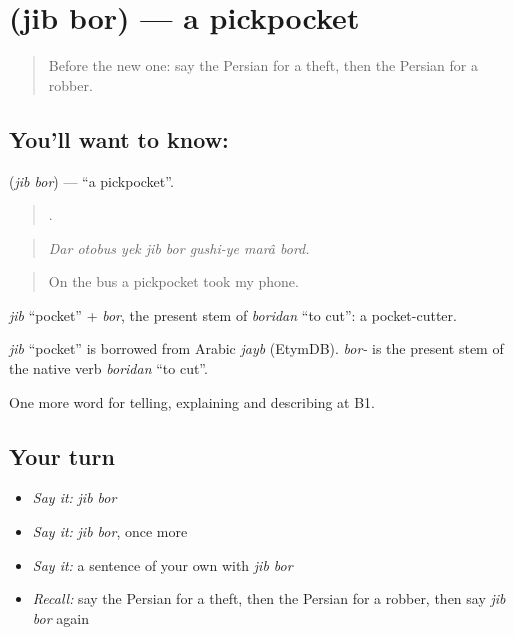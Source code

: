 \section[\texorpdfstring{\fa{جیب} \fa{بر} (jib bor)}{جیب بر (jib bor)}]{  (jib bor) — a pickpocket}

\label{lesson:FA-C316-jib-bor}



\begin{quote}
Before the new one: say the Persian for a theft, then the Persian for a robber.
\end{quote}

\subsection*{You'll want to know:  }
\textbf{ } (\emph{jib bor}) — \textquotedblleft{}a pickpocket\textquotedblright{}.

\begin{quote}
       .
\end{quote}

\begin{quote}
\emph{Dar otobus yek jib bor gushi-ye marâ bord.}
\end{quote}

\begin{quote}
On the bus a pickpocket took my phone.
\end{quote}

\emph{jib} \textquotedblleft{}pocket\textquotedblright{} + \emph{bor}, the present stem of \emph{boridan} \textquotedblleft{}to cut\textquotedblright{}: a pocket-cutter.

\begin{cousinweb}
\emph{jib} \textquotedblleft{}pocket\textquotedblright{} is borrowed from Arabic \emph{jayb} (EtymDB). \emph{bor-} is the present stem of the native verb \emph{boridan} \textquotedblleft{}to cut\textquotedblright{}.
\end{cousinweb}

\begin{grammarlens}[title={What you've built}]
One more word for telling, explaining and describing at B1.
\end{grammarlens}

\subsection*{Your turn}
\begin{itemize}
\raggedright
  \item \emph{Say it:} \emph{jib bor}
  \item \emph{Say it:} \emph{jib bor}, once more
  \item \emph{Say it:} a sentence of your own with \emph{jib bor}
  \item \emph{Recall:} say the Persian for a theft, then the Persian for a robber, then say \emph{jib bor} again
\end{itemize}

